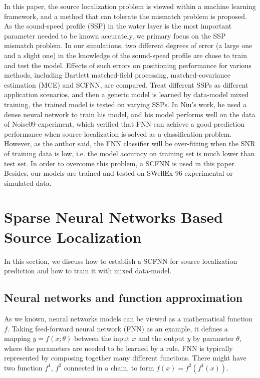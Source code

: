 In this paper, the source localization problem is viewed within a machine learning framework, and a method that can tolerate the mismatch problem is proposed.
As the sound-speed profile (SSP) in the water layer is the most important parameter needed to be known accurately\cite{feuillade1989environmental}, we primary focus on the SSP
mismatch problem.
In our simulations, two different degrees of error (a large one and a slight one) in the knowledge of the sound-speed profile are chose to train and test the model.
Effects of such errors on positioning performance for various methods, including Bartlett matched-field processing, matched-covariance estimation (MCE) and SCFNN, are compared.
Treat different SSPs as different application scenarios, and then a generic model is learned by data-model mixed training, the trained model is tested on
varying SSPs.
In Niu's work\cite{niu2017source}, he used a dense neural network to train his model, and his model performs well on the data of Noise09 experiment, which verified that FNN can achieve a good prediction performance when source localization is solved as a classification problem. However, as the author said, the FNN classifier will be over-fitting when the SNR of training data is low, i.e. the model accuracy on training set is much lower than test set. In order to overcome this problem,
a SCFNN is used in this paper. Besides, our models are trained and tested on SWellEx-96 experimental or simulated data.

\section{Sparse Neural Networks Based Source Localization}
In this section, we discuss how to establish a SCFNN for
source localization prediction and how to train it with mixed data-model.

\subsection{Neural networks and function approximation}
As we known, neural networks models can be viewed as a mathematical function $f$. Taking feed-forward neural network (FNN) as an example, it defines a mapping ${{y}}=f(x;\theta )$ between the input $x$ and the output $y$ by parameter $\theta$, where the parameters are needed to be learned by a rule. FNN is typically represented by composing together many different functions. There might have two function $f^{1}$, $f^{2}$ connected in a chain\cite{goodfellow2016deep}, to form
$f(x) = f^{2}(f^{1}(x))$.

